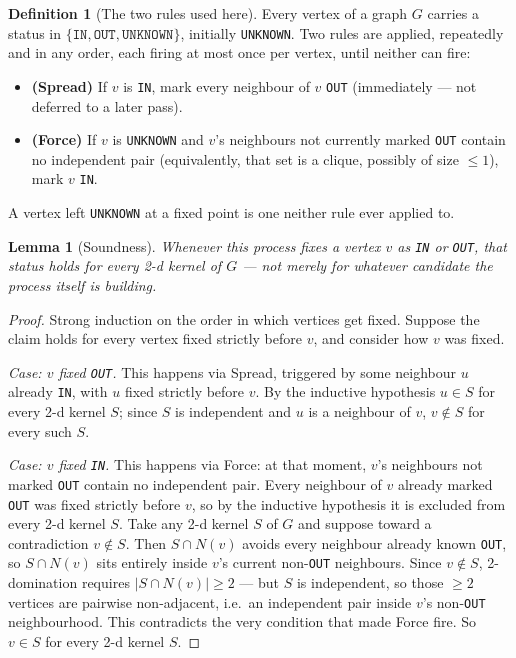 \documentclass[11pt]{article}
\theoremstyle{plain}
\newtheorem{lemma}[theorem]{Lemma}
\theoremstyle{definition}
\newtheorem{definition}[theorem]{Definition}
\begin{document}
\pagestyle{empty}

\begin{definition}[The two rules used here]
\label{def:rules}
Every vertex of a graph $G$ carries a status in $\{\texttt{IN}, \texttt{OUT},
\texttt{UNKNOWN}\}$, initially \texttt{UNKNOWN}. Two rules are applied, repeatedly
and in any order, each firing at most once per vertex, until neither can fire:
\begin{itemize}[nosep]
\item \textbf{(Spread)} If $v$ is \texttt{IN}, mark every neighbour of $v$
\texttt{OUT} (immediately — not deferred to a later pass).
\item \textbf{(Force)} If $v$ is \texttt{UNKNOWN} and $v$'s neighbours not
currently marked \texttt{OUT} contain no independent pair (equivalently, that set
is a clique, possibly of size $\le 1$), mark $v$ \texttt{IN}.
\end{itemize}
A vertex left \texttt{UNKNOWN} at a fixed point is one neither rule ever applied to.
\end{definition}

\begin{lemma}[Soundness]
\label{lem:sound}
Whenever this process fixes a vertex $v$ as \texttt{IN} or \texttt{OUT}, that status
holds for \emph{every} 2-d kernel of $G$ — not merely for whatever candidate the
process itself is building.
\end{lemma}

\begin{proof}
Strong induction on the order in which vertices get fixed. Suppose the claim holds
for every vertex fixed strictly before $v$, and consider how $v$ was fixed.

\emph{Case: $v$ fixed \texttt{OUT}.} This happens via Spread, triggered by some
neighbour $u$ already \texttt{IN}, with $u$ fixed strictly before $v$. By the
inductive hypothesis $u \in S$ for every 2-d kernel $S$; since $S$ is independent and
$u$ is a neighbour of $v$, $v \notin S$ for every such $S$.

\emph{Case: $v$ fixed \texttt{IN}.} This happens via Force: at that moment, $v$'s
neighbours not marked \texttt{OUT} contain no independent pair. Every neighbour of
$v$ already marked \texttt{OUT} was fixed strictly before $v$, so by the inductive
hypothesis it is excluded from every 2-d kernel $S$. Take any 2-d kernel $S$ of $G$ and
suppose toward a contradiction $v \notin S$. Then $S \cap N(v)$ avoids every
neighbour already known \texttt{OUT}, so $S \cap N(v)$ sits entirely inside $v$'s
current non-\texttt{OUT} neighbours. Since $v \notin S$, 2-domination requires
$|S \cap N(v)| \ge 2$ — but $S$ is independent, so those $\ge 2$ vertices are
pairwise non-adjacent, i.e.\ an independent pair inside $v$'s non-\texttt{OUT}
neighbourhood. This contradicts the very condition that made Force fire. So
$v \in S$ for every 2-d kernel $S$.
\end{proof}
\end{document}
